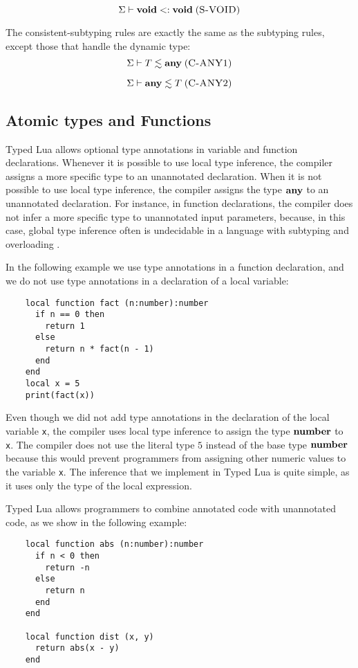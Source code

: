 \[
\Sigma \vdash \mathbf{void} <: \mathbf{void}
\; (\textsc{S-VOID})
\]

The consistent-subtyping rules are exactly the same as the subtyping rules,
except those that handle the dynamic type:
\[
\Sigma \vdash T \lesssim \mathbf{any}
\; (\textsc{C-ANY1})
\]

\[
\Sigma \vdash \mathbf{any} \lesssim T
\; (\textsc{C-ANY2})
\]

\subsection{Atomic types and Functions}

Typed Lua allows optional type annotations in variable and function
declarations.
Whenever it is possible to use local type inference, the compiler
assigns a more specific type to an unannotated declaration.
When it is not possible to use local type inference, the compiler
assigns the type $\mathbf{any}$ to an unannotated declaration.
For instance, in function declarations, the compiler does not infer
a more specific type to unannotated input parameters, because,
in this case, global type inference often is undecidable in a
language with subtyping and overloading \citep{wells1999typability}.

In the following example we use type annotations in a function
declaration, and we do not use type annotations in a declaration of a
local variable:
\begin{verbatim}
    local function fact (n:number):number
      if n == 0 then
        return 1
      else
        return n * fact(n - 1)
      end
    end
    local x = 5
    print(fact(x))
\end{verbatim}

Even though we did not add type annotations in the declaration of
the local variable \texttt{x}, the compiler uses local type inference to
assign the type $\mathbf{number}$ to \texttt{x}.
The compiler does not use the literal type $5$ instead of the base
type $\mathbf{number}$ because this would prevent
programmers from assigning other numeric values to the variable
\texttt{x}.
The inference that we implement in Typed Lua is quite simple, as it
uses only the type of the local expression.

Typed Lua allows programmers to combine annotated code with
unannotated code, as we show in the following example:
\begin{verbatim}
    local function abs (n:number):number
      if n < 0 then
        return -n
      else
        return n
      end
    end

    local function dist (x, y)
      return abs(x - y)
    end
\end{verbatim}

